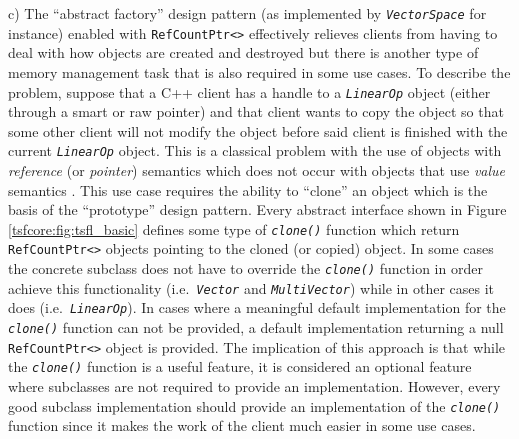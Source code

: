 c) The ``abstract factory'' design pattern (as implemented by
{}\texttt{\textit{VectorSpace}} for instance) enabled with
{}\texttt{RefCountPtr<>} effectively relieves clients from having to
deal with how objects are created and destroyed but there is another
type of memory management task that is also required in some use
cases.  To describe the problem, suppose that a C++ client has a
handle to a {}\texttt{\textit{LinearOp}} object (either through a
smart or raw pointer) and that client wants to copy the object so that
some other client will not modify the object before said client is
finished with the current {}\texttt{\textit{LinearOp}} object.  This
is a classical problem with the use of objects with {\em reference}
(or {\em pointer}) semantics which does not occur with objects that
use {\em value} semantics {}\cite{ref:stroustrup_1997}.  This use case
requires the ability to ``clone'' an object which is the basis of the
``prototype'' design pattern.  Every abstract interface shown in
Figure {}\ref{tsfcore:fig:tsfl_basic} defines some type of
{}\texttt{\textit{clone()}} function which return
{}\texttt{RefCountPtr<>} objects pointing to the cloned (or copied)
object.  In some cases the concrete subclass does not have to override
the {}\texttt{\textit{clone()}} function in order achieve this
functionality (i.e.~\texttt{\textit{Vector}} and
{}\texttt{\textit{Multi\-Vector}}) while in other cases it does
(i.e.~\texttt{\textit{LinearOp}}).  In cases where a meaningful
default implementation for the {}\texttt{\textit{clone()}} function can
not be provided, a default implementation returning a null
{}\texttt{RefCountPtr<>} object is provided.  The implication of this
approach is that while the {}\texttt{\textit{clone()}} function is a
useful feature, it is considered an optional feature where subclasses
are not required to provide an implementation.  However, every good
subclass implementation should provide an implementation of the
{}\texttt{\textit{clone()}} function since it makes the work of the
client much easier in some use cases.
	
